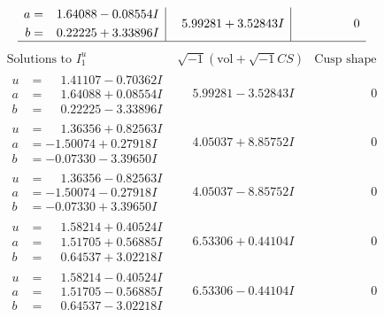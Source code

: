 \documentclass[1p]{elsarticle_modified}
\theoremstyle{definition}
\newcommand{\I}{\sqrt{-1}}
\begin{document}
$$\begin{array}{c|c|c}
\begin{aligned}
a &= \phantom{-}1.64088 - 0.08554 I \\
b &= \phantom{-}0.22225 + 3.33896 I\end{aligned}
 & \phantom{-}5.99281 + 3.52843 I & \phantom{-0.000000 } 0\\
 \hline 
 \end{array}$$\newpage$$\begin{array}{c|c|c}  
\text{Solutions to }I^u_{1}& \I (\text{vol} + \sqrt{-1}CS) & \text{Cusp shape}\\
 \hline 
\begin{aligned}
u &= \phantom{-}1.41107 - 0.70362 I \\
a &= \phantom{-}1.64088 + 0.08554 I \\
b &= \phantom{-}0.22225 - 3.33896 I\end{aligned}
 & \phantom{-}5.99281 - 3.52843 I & \phantom{-0.000000 } 0 \\ \hline\begin{aligned}
u &= \phantom{-}1.36356 + 0.82563 I \\
a &= -1.50074 + 0.27918 I \\
b &= -0.07330 - 3.39650 I\end{aligned}
 & \phantom{-}4.05037 + 8.85752 I & \phantom{-0.000000 } 0 \\ \hline\begin{aligned}
u &= \phantom{-}1.36356 - 0.82563 I \\
a &= -1.50074 - 0.27918 I \\
b &= -0.07330 + 3.39650 I\end{aligned}
 & \phantom{-}4.05037 - 8.85752 I & \phantom{-0.000000 } 0 \\ \hline\begin{aligned}
u &= \phantom{-}1.58214 + 0.40524 I \\
a &= \phantom{-}1.51705 + 0.56885 I \\
b &= \phantom{-}0.64537 + 3.02218 I\end{aligned}
 & \phantom{-}6.53306 + 0.44104 I & \phantom{-0.000000 } 0 \\ \hline\begin{aligned}
u &= \phantom{-}1.58214 - 0.40524 I \\
a &= \phantom{-}1.51705 - 0.56885 I \\
b &= \phantom{-}0.64537 - 3.02218 I\end{aligned}
 & \phantom{-}6.53306 - 0.44104 I & \phantom{-0.000000 } 0 \\ \hline\begin{aligned}

\end{aligned}
\end{array}$$
\end{document}
